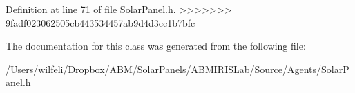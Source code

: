 Definition at line 71 of file Solar\+Panel.\+h.
>>>>>>> 9fadf023062505cb443534457ab9d4d3cc1b7bfc



The documentation for this class was generated from the following file\+:\begin{DoxyCompactItemize}
\item 
/\+Users/wilfeli/\+Dropbox/\+A\+B\+M/\+Solar\+Panels/\+A\+B\+M\+I\+R\+I\+S\+Lab/\+Source/\+Agents/\hyperlink{_solar_panel_8h}{Solar\+Panel.\+h}\end{DoxyCompactItemize}
